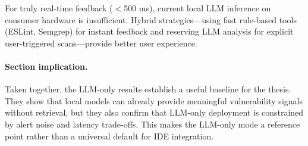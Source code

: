 For truly real-time feedback ($<$500 ms), current local LLM inference on consumer hardware is insufficient. Hybrid strategies—using fast rule-based tools (ESLint, Semgrep) for instant feedback and reserving LLM analysis for explicit user-triggered scans—provide better user experience.

\paragraph{Section implication.}
Taken together, the LLM-only results establish a useful baseline for the thesis. They show that local models can already provide meaningful vulnerability signals without retrieval, but they also confirm that LLM-only deployment is constrained by alert noise and latency trade-offs. This makes the LLM-only mode a reference point rather than a universal default for IDE integration.
